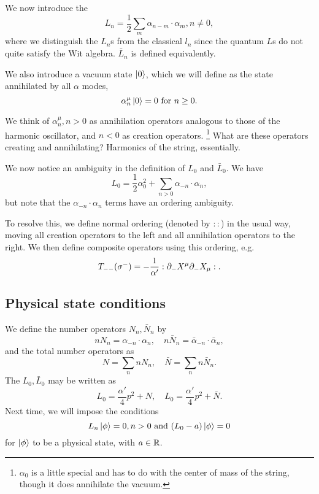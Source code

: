 We now introduce the 
\begin{equation}
    L_n=\frac{1}{2} \sum_m \alpha_{n-m} \cdot \alpha_m, n\neq 0,
\end{equation}
where we distinguish the $L_n$s from the classical $l_n$ since the quantum $L$s do not quite satisfy the Wit algebra. $\bar L_n$ is defined equivalently.

We also introduce a vacuum state $\left| 0 \right>$, which we will define as the state annihilated by all $\alpha$ modes,
\begin{equation}
    \alpha_n^\mu \left| 0 \right> =0 \text{ for }n\geq 0.
\end{equation}

We think of $\alpha_n^\mu, n > 0$ as annihilation operators analogous to those of the harmonic oscillator, and $n<0$ as creation operators.%
    \footnote{$\alpha_0$ is a little special and has to do with the center of mass of the string, though it does annihilate the vacuum.}
What are these operators creating and annihilating? Harmonics of the string, essentially.

We now notice an ambiguity in the definition of $L_0$ and $\bar L_0$. We have
\begin{equation}
    L_0=\frac{1}{2} \alpha_0^2 + \sum_{n>0} \alpha_{-n} \cdot \alpha_n,
\end{equation}
but note that the $\alpha_{-n} \cdot \alpha_n$ terms have an ordering ambiguity.

To resolve this, we define normal ordering (denoted by $: :$) in the usual way, moving all creation operators to the left and all annihilation operators to the right. We then define composite operators using this ordering, e.g.
\begin{equation}
    T_{--}(\sigma^-)=-\frac{1}{\alpha'} :\partial_- X^\mu \partial_- X_\mu :.
\end{equation}

\subsection*{Physical state conditions}
We define the number operators $N_n, \bar N_n$ by
\begin{equation}
    nN_n = \alpha_{-n} \cdot \alpha_n,\quad n \bar N_n = \bar \alpha_{-n} \cdot \bar \alpha_n,
\end{equation}
and the total number operators as
\begin{equation}
    N=\sum_n n N_n, \quad \bar N = \sum_n n \bar N_n.
\end{equation}
%
The $L_0,\bar L_0$ may be written as
\begin{equation}
    L_0=\frac{\alpha'}{4} p^2 +N, \quad L_0=\frac{\alpha'}{4} p^2 +\bar N.
\end{equation}
Next time, we will impose the conditions
\begin{equation}
    L_n\left| \phi \right>=0, n>0 \text{ and }(L_0-a)\left| \phi \right>=0
\end{equation}
for $\left| \phi \right>$ to be a physical state, with $a\in \mathbb{R}$.